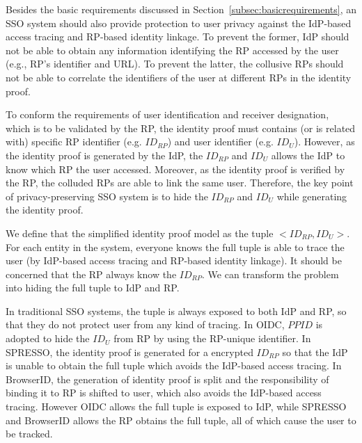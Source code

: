 Besides the basic requirements discussed in Section~\ref{subsec:basicrequirements}, an SSO system should also provide protection to user privacy against the IdP-based access tracing %
and RP-based identity linkage. To prevent the former,  IdP should not be able to obtain any information identifying the RP accessed by the user (e.g., RP's identifier and URL). To prevent the latter, the collusive RPs should not be able to correlate the identifiers of the user at different RPs in the identity proof.

To conform the requirements of user identification and receiver designation, which is to be validated by the RP, the identity proof must contains (or is related with) specific RP identifier (e.g. $ID_{RP}$) and user identifier (e.g. $ID_U$). However, as the identity proof is generated by the IdP, the $ID_{RP}$ and $ID_U$ allows the IdP to know which RP the user accessed. Moreover, as the identity proof is verified by the RP, the colluded RPs are able to link the same user.
Therefore, the key point of privacy-preserving SSO system is to hide the $ID_{RP}$ and $ID_U$ while generating the identity proof.

We define that the simplified identity proof model as the tuple $<ID_{RP}, ID_U>$. For each entity in the system, everyone knows the full tuple is able to trace the user (by IdP-based access tracing and RP-based identity linkage). It should be concerned that the RP always know the $ID_{RP}$. We can transform the problem into hiding the full tuple to IdP and RP. 

In traditional SSO systems, the tuple is always exposed to both IdP and RP, so that they do not protect user from any kind of tracing. In OIDC, $PPID$ is adopted to hide the $ID_U$ from RP by using the RP-unique identifier. In SPRESSO, the identity proof is generated for a encrypted $ID_{RP}$ so that the IdP is unable to obtain the full tuple which avoids the IdP-based access tracing. In BrowserID, the generation of identity proof is split and the responsibility of binding it to RP is shifted to user, which also avoids the IdP-based access tracing. However OIDC allows the full tuple is exposed to IdP, while SPRESSO and BrowserID allows the RP obtains the full tuple, all of which cause the user to be tracked.

